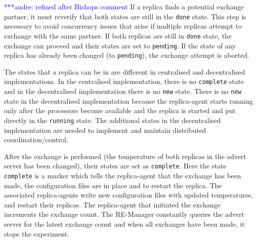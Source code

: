 \documentclass{rspublic}
\newcommand{\jhanote}[1]{ {\textcolor{red} { ***shantenu: #1 }}}
\newcommand{\alnote}[1]{ {\textcolor{blue} { ***andre: #1 }}}
\newcommand{\athotanote}[1]{ {\textcolor{green} { ***athota: #1 }}}
\newcommand{\alnote}[1]{}
\newcommand{\athotanote}[1]{}
\newcommand{\jhanote}[1]{}
\begin{document}
\alnote{refined after Bishops comment}
If a replica finds a potential exchange partner, it must reverify that both
states are still in the \texttt{done} state. This step is necessary to avoid 
concurrency issues that arise if multiple replicas attempt to exchange with
the same partner. If both replicas are still in
\texttt{done} state, the exchange can proceed and their states are set
to \texttt{pending}.  If the state of any replica has already been
changed (to \texttt{pending}), the  exchange attempt is
aborted.

The states that a replica can be in are different in centralised and 
decentralised implementations. In the centralised implementation, there is no
\texttt{complete} state and in the decentralised implementation there
is no \texttt{new} state. There is no \texttt{new} state in the
decentralised implementation because the replica-agent starts running
only after the processors become available and the replica is
started and put directly in the \texttt{running} state. The additional states in the decentralised implementation are
needed to implement and maintain distributed coordination/control.




After the exchange is performed (the temperature of both replicas in
the advert server has been changed), their states are set as
\texttt{complete}. Here the state \texttt{complete} is a marker
which tells the replica-agent that the exchange has been made, the
configuration files are in place and to restart the replica.  
The associated replica-agents write new
configuration files with updated temperatures, and restart their
replicas. The replica-agent that initiated the exchange increments the
exchange count. The RE-Manager constantly queries the advert server
for the latest exchange count and when all exchanges have been made,
it stops the experiment.
\end{document}
